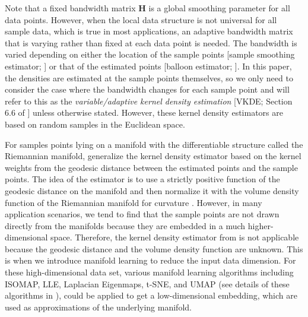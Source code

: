 \documentclass[11pt,a4paper,]{article}
\begin{document}
Note that a fixed bandwidth matrix \(\pmb{H}\) is a global smoothing parameter for all data points. However, when the local data structure is not universal for all sample data, which is true in most applications, an adaptive bandwidth matrix that is varying rather than fixed at each data point is needed.
The bandwidth is varied depending on either the location of the sample points {[}sample smoothing estimator; \textcite{Terrell1992-ut}{]} or that of the estimated points {[}balloon estimator; \textcite{Terrell1992-ut}{]}. In this paper, the densities are estimated at the sample points themselves, so we only need to consider the case where the bandwidth changes for each sample point and will refer to this as the \emph{variable/adaptive kernel density estimation} {[}VKDE; Section 6.6 of \textcite{Scott2015-vl}{]} unless otherwise stated.
However, these kernel density estimators are based on random samples in the Euclidean space.

For samples points lying on a manifold with the differentiable structure called the Riemannian manifold, \textcite{Pelletier2005-vu} generalize the kernel density estimator based on the kernel weights from the geodesic distance between the estimated points and the sample points. The idea of the estimator is to use a strictly positive function of the geodesic distance on the manifold and then normalize it with the volume density function of the Riemannian manifold for curvature \autocite{Henry2009-ll}.
However, in many application scenarios, we tend to find that the sample points are not drawn directly from the manifolds because they are embedded in a much higher-dimensional space. Therefore, the kernel density estimator from \textcite{Pelletier2005-vu} is not applicable because the geodesic distance and the volume density function are unknown.
This is when we introduce manifold learning to reduce the input data dimension. For these high-dimensional data set, various manifold learning algorithms including ISOMAP, LLE, Laplacian Eigenmaps, t-SNE, and UMAP (see details of these algorithms in \textcite{Cheng2021-dh}), could be applied to get a low-dimensional embedding, which are used as approximations of the underlying manifold.
\end{document}
